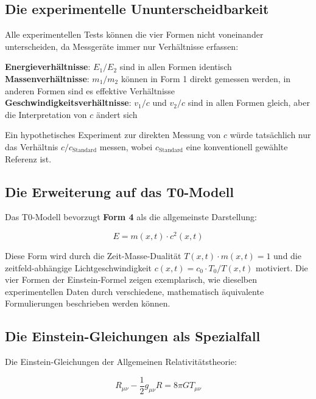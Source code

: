 \documentclass[12pt,a4paper]{report}
\begin{document}
	\subsection{Die experimentelle Ununterscheidbarkeit}
	
	Alle experimentellen Tests können die vier Formen nicht voneinander unterscheiden, da Messgeräte immer nur Verhältnisse erfassen:
	
	\textbf{Energieverhältnisse}: $E_1/E_2$ sind in allen Formen identisch\\
	\textbf{Massenverhältnisse}: $m_1/m_2$ können in Form 1 direkt gemessen werden, in anderen Formen sind es effektive Verhältnisse\\
	\textbf{Geschwindigkeitsverhältnisse}: $v_1/c$ und $v_2/c$ sind in allen Formen gleich, aber die Interpretation von $c$ ändert sich
	
	Ein hypothetisches Experiment zur direkten Messung von $c$ würde tatsächlich nur das Verhältnis $c/c_{\text{Standard}}$ messen, wobei $c_{\text{Standard}}$ eine konventionell gewählte Referenz ist.
	
	\subsection{Die Erweiterung auf das T0-Modell}
	
	Das T0-Modell bevorzugt \textbf{Form 4} als die allgemeinste Darstellung:
	
	\begin{equation}
		E = m(x,t) \cdot c^2(x,t)
	\end{equation}
	
	Diese Form wird durch die Zeit-Masse-Dualität $T(x,t) \cdot m(x,t) = 1$ und die zeitfeld-abhängige Lichtgeschwindigkeit $c(x,t) = c_0 \cdot T_0/T(x,t)$ motiviert. Die vier Formen der Einstein-Formel zeigen exemplarisch, wie dieselben experimentellen Daten durch verschiedene, mathematisch äquivalente Formulierungen beschrieben werden können.
	
	\subsection{Die Einstein-Gleichungen als Spezialfall}
	
	Die Einstein-Gleichungen der Allgemeinen Relativitätstheorie:
	
	\begin{equation}
		R_{\mu\nu} - \frac{1}{2}g_{\mu\nu}R = 8\pi GT_{\mu\nu}
	\end{equation}
	
\end{document}
